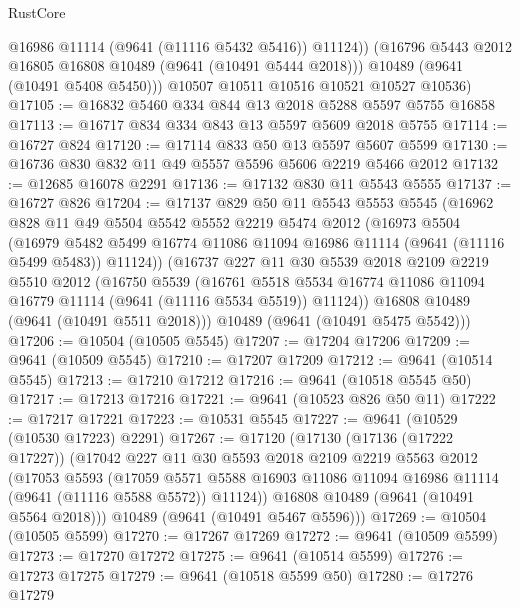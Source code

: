 \begin{lexlean}{RustCore}
\begin{coremodule}
            @16986
            @11114
            (@9641 (@11116 @5432 @5416))
            @11124))
        (@16796 @5443 @2012 @16805 @16808 @10489 (@9641 (@10491 @5444 @2018)))
        @10489
        (@9641 (@10491 @5408 @5450)))
      @10507
      @10511
      @10516
      @10521
      @10527
      @10536)
@17105 := @16832 @5460 @334 @844 @13 @2018 @5288 @5597 @5755 @16858
@17113 := @16717 @834 @334 @843 @13 @5597 @5609 @2018 @5755
@17114 := @16727 @824
@17120 := @17114 @833 @50 @13 @5597 @5607 @5599
@17130 := @16736 @830 @832 @11 @49 @5557 @5596 @5606 @2219 @5466 @2012
@17132 := @12685 @16078 @2291
@17136 := @17132 @830 @11 @5543 @5555
@17137 := @16727 @826
@17204 := @17137
    @829
    @50
    @11
    @5543
    @5553
    @5545
    (@16962
      @828
      @11
      @49
      @5504
      @5542
      @5552
      @2219
      @5474
      @2012
      (@16973
        @5504
        (@16979 @5482 @5499 @16774 @11086 @11094 @16986 @11114 (@9641 (@11116 @5499 @5483)) @11124))
      (@16737
        @227
        @11
        @30
        @5539
        @2018
        @2109
        @2219
        @5510
        @2012
        (@16750
          @5539
          (@16761
            @5518
            @5534
            @16774
            @11086
            @11094
            @16779
            @11114
            (@9641 (@11116 @5534 @5519))
            @11124))
        @16808
        @10489
        (@9641 (@10491 @5511 @2018)))
      @10489
      (@9641 (@10491 @5475 @5542)))
@17206 := @10504 (@10505 @5545)
@17207 := @17204 @17206
@17209 := @9641 (@10509 @5545)
@17210 := @17207 @17209
@17212 := @9641 (@10514 @5545)
@17213 := @17210 @17212
@17216 := @9641 (@10518 @5545 @50)
@17217 := @17213 @17216
@17221 := @9641 (@10523 @826 @50 @11)
@17222 := @17217 @17221
@17223 := @10531 @5545
@17227 := @9641 (@10529 (@10530 @17223) @2291)
@17267 := @17120
    (@17130
      (@17136 (@17222 @17227))
      (@17042
        @227
        @11
        @30
        @5593
        @2018
        @2109
        @2219
        @5563
        @2012
        (@17053
          @5593
          (@17059
            @5571
            @5588
            @16903
            @11086
            @11094
            @16986
            @11114
            (@9641 (@11116 @5588 @5572))
            @11124))
        @16808
        @10489
        (@9641 (@10491 @5564 @2018)))
      @10489
      (@9641 (@10491 @5467 @5596)))
@17269 := @10504 (@10505 @5599)
@17270 := @17267 @17269
@17272 := @9641 (@10509 @5599)
@17273 := @17270 @17272
@17275 := @9641 (@10514 @5599)
@17276 := @17273 @17275
@17279 := @9641 (@10518 @5599 @50)
@17280 := @17276 @17279

\end{coremodule}
\end{lexlean}
